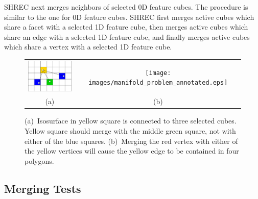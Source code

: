 SHREC next merges neighbors of selected 0D feature cubes.
The procedure is similar to the one for 0D feature cubes.
SHREC first merges active cubes which share a facet with a selected 1D feature cube,
then merges active cubes which share an edge with a selected 1D feature cube,
and finally merges active cubes which share a vertex 
with a selected 1D feature cube.


\begin{figure}[t]
\centering

\begin{tabular}{cc}
\includegraphics[width=1.2in]{images/connectedToIII.eps} \quad &
\quad
\texttt{[image: images/manifold\_problem\_annotated.eps]} \\
(a) & (b)
\end{tabular}

\caption{(a)~Isosurface in yellow square is connected to three selected cubes.
Yellow square should merge with the middle green square,
not with either of the blue squares.
(b)~Merging the red vertex with either of the yellow vertices
will cause the yellow edge to be contained in four polygons.}

\label{fig:connectedToIII}
\label{fig:manifold_problem}
\end{figure}

\subsection{Merging Tests}
\label{section:merging_tests}

